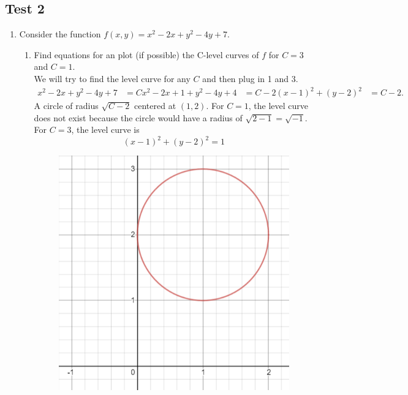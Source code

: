 \subsection{Test 2}
\begin{enumerate}
	\item Consider the function $f(x,y) = x^2 - 2x + y^2 - 4y + 7$.\\
	\begin{enumerate}[label=\alph*.]
		\item Find equations for an plot (if possible) the C-level curves of $f$ for $C = 3$ and $C = 1$.\\
		We will try to find the level curve for any $C$ and then plug in 1 and 3.
		\begin{align*}
			x^2 - 2x + y^2 - 4y + 7 &= C
			x^2 - 2x + 1 + y^2 - 4y + 4 &= C-2
			(x-1)^2 + (y-2)^2 &= C-2		.
		\end{align*}
		A circle of radius $\sqrt{C-2}$ centered at $(1,2)$.
		For $C = 1$, the level curve does not exist because the circle would have a radius of $\sqrt{2-1} = \sqrt{-1}$.
		For $C = 3$, the level curve is 
		\begin{equation*}
			(x-1)^2 + (y-2)^2 = 1
		\end{equation*}
		
		\begin{figure}[H]
			\centering
			\includegraphics[scale=.25]{Images/additionalMaterials/test2_circle}
		\end{figure}
		

\end{enumerate}
\end{enumerate}

